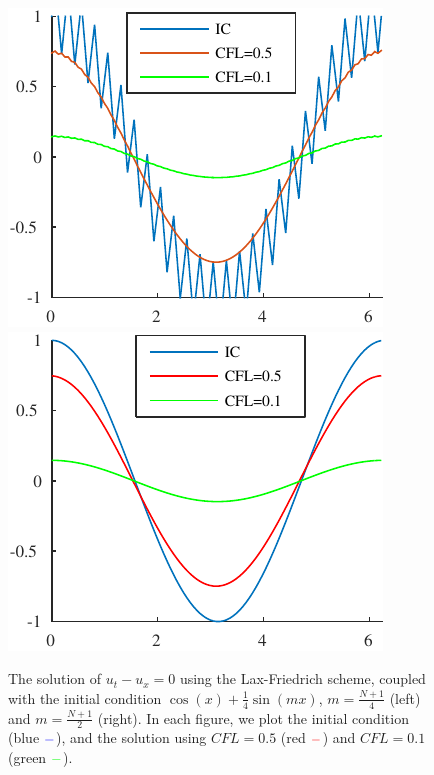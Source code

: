 \documentclass[10pt,a4paper,twoside, french]{article}
\numberwithin{equation}{section}
\numberwithin{figure}{section}
\numberwithin{table}{section}
\begin{document}
\begin{enumerate}
\begin{enumerate}[a.]
\begin{figure}
\centering
\includegraphics[scale=1]{fig/LAXF_IC1}
\includegraphics[scale=1]{fig/LAXF_IC2}
\caption{The solution of $u_t-u_x=0$ using the Lax-Friedrich scheme, coupled with the initial condition $\cos(x)+\frac{1}{4}\sin(mx)$, $m=\frac{N+1}{4}$ (left) and $m=\frac{N+1}{2}$ (right). In each figure, we plot the initial condition (blue $\color{blue} -$), and the solution using $CFL=0.5$ (red $\color{red} -$) and $CFL=0.1$ (green $\color{green} -$).}
\end{figure}


\end{enumerate}
\end{enumerate}
\end{document}
